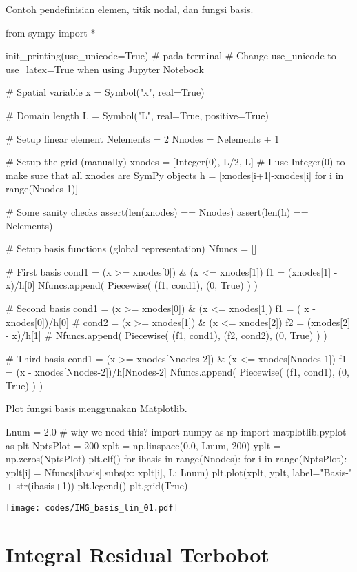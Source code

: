 Contoh pendefinisian elemen, titik nodal, dan fungsi basis.
\begin{pythoncode}
from sympy import *

init_printing(use_unicode=True) # pada terminal
# Change use_unicode to use_latex=True when using Jupyter Notebook

# Spatial variable
x = Symbol("x", real=True)

# Domain length
L = Symbol("L", real=True, positive=True)


# Setup linear element
Nelements = 2 
Nnodes = Nelements + 1

# Setup the grid (manually)
xnodes = [Integer(0), L/2, L]
# I use Integer(0) to make sure that all xnodes are SymPy objects
h = [xnodes[i+1]-xnodes[i] for i in range(Nnodes-1)]

# Some sanity checks
assert(len(xnodes) == Nnodes)
assert(len(h) == Nelements)


# Setup basis functions (global representation)
Nfuncs = []

# First basis
cond1 = (x >= xnodes[0]) & (x <= xnodes[1])
f1 = (xnodes[1] - x)/h[0]
Nfuncs.append( Piecewise( (f1, cond1), (0, True) ) )

# Second basis
cond1 = (x >= xnodes[0]) & (x <= xnodes[1])
f1 = ( x - xnodes[0])/h[0]
#
cond2 = (x >= xnodes[1]) & (x <= xnodes[2])
f2 = (xnodes[2] - x)/h[1]
#
Nfuncs.append( Piecewise( (f1, cond1), (f2, cond2), (0, True) ) )

# Third basis
cond1 = (x >= xnodes[Nnodes-2]) & (x <= xnodes[Nnodes-1])
f1 = (x - xnodes[Nnodes-2])/h[Nnodes-2]
Nfuncs.append( Piecewise( (f1, cond1), (0, True) ) )
\end{pythoncode}

Plot fungsi basis menggunakan Matplotlib.
\begin{pythoncode}
Lnum = 2.0 # why we need this?
import numpy as np
import matplotlib.pyplot as plt
NptsPlot = 200
xplt = np.linspace(0.0, Lnum, 200)
yplt = np.zeros(NptsPlot)
plt.clf()
for ibasis in range(Nnodes):
    for i in range(NptsPlot):
        yplt[i] = Nfuncs[ibasis].subs({x: xplt[i], L: Lnum})
    plt.plot(xplt, yplt, label="Basis-" + str(ibasis+1))
plt.legend()
plt.grid(True)
\end{pythoncode}

{\centering
\texttt{[image: codes/IMG\_basis\_lin\_01.pdf]}
\par}


\section{Integral Residual Terbobot}

